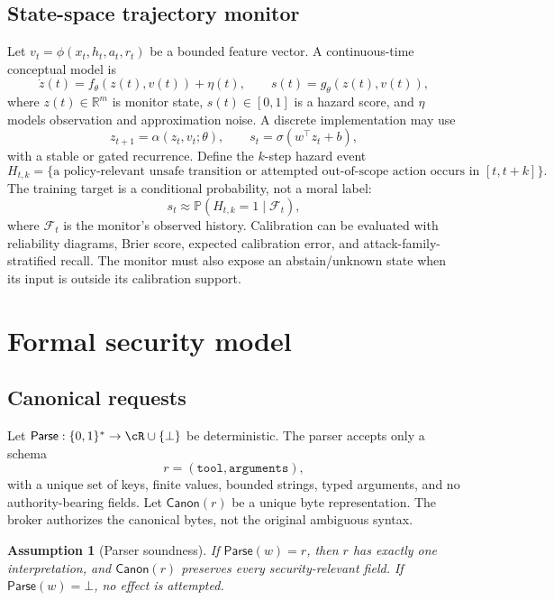 \documentclass[11pt]{article}
\newtheorem{assumption}[definition]{Assumption}
\newcommand{\R}{\mathbb{R}}
\newcommand{\Prob}{\mathbb{P}}
\newcommand{\1}{\mathbf{1}}
\begin{document}
\subsection{State-space trajectory monitor}
Let $v_t=\phi(x_t,h_t,a_t,r_t)$ be a bounded feature vector. A continuous-time conceptual model is
\begin{equation}
 \dot z(t)=f_\theta(z(t),v(t))+\eta(t), \qquad s(t)=g_\theta(z(t),v(t)),
\end{equation}
where $z(t)\in\R^m$ is monitor state, $s(t)\in[0,1]$ is a hazard score, and $\eta$ models observation and approximation noise. A discrete implementation may use
\begin{equation}
 z_{t+1}=\alpha(z_t,v_t;\theta), \qquad s_t=\sigma(w^\top z_t+b),
\end{equation}
with a stable or gated recurrence. Define the $k$-step hazard event
\[
 H_{t,k}=\{\text{a policy-relevant unsafe transition or attempted out-of-scope action occurs in }[t,t+k]\}.
\]
The training target is a conditional probability, not a moral label:
\begin{equation}
 s_t \approx \Prob(H_{t,k}=1\mid \mathcal{F}_t),
\end{equation}
where $\mathcal{F}_t$ is the monitor's observed history. Calibration can be evaluated with reliability diagrams, Brier score, expected calibration error, and attack-family-stratified recall. The monitor must also expose an abstain/unknown state when its input is outside its calibration support.

\section{Formal security model}

\subsection{Canonical requests}
Let $\mathsf{Parse}:\{0,1\}^*\to\cR\cup\{\bot\}$ be deterministic. The parser accepts only a schema
\[
 r=(\texttt{tool},\texttt{arguments}),
\]
with a unique set of keys, finite values, bounded strings, typed arguments, and no authority-bearing fields. Let $\mathsf{Canon}(r)$ be a unique byte representation. The broker authorizes the canonical bytes, not the original ambiguous syntax.

\begin{assumption}[Parser soundness]
If $\mathsf{Parse}(w)=r$, then $r$ has exactly one interpretation, and $\mathsf{Canon}(r)$ preserves every security-relevant field. If $\mathsf{Parse}(w)=\bot$, no effect is attempted.
\end{assumption}
\end{document}
